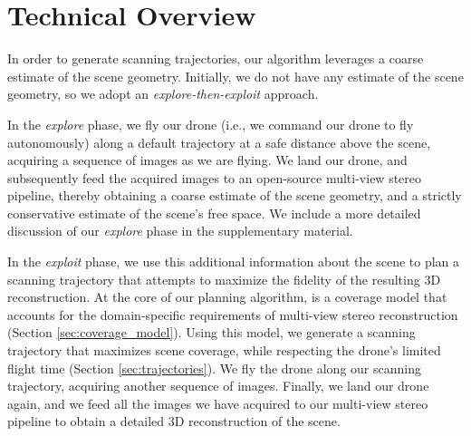 \vspace{-5pt}
\section{Technical Overview}
\label{sec:overview}

In order to generate scanning trajectories, our algorithm leverages a coarse estimate of the scene geometry.
Initially, we do not have any estimate of the scene geometry, so we adopt an \emph{explore-then-exploit} approach.

In the \emph{explore} phase, we fly our drone (i.e., we command our drone to fly autonomously) along a default trajectory at a safe distance above the scene, acquiring a sequence of images as we are flying.
We land our drone, and subsequently feed the acquired images to an open-source multi-view stereo pipeline, thereby obtaining a coarse estimate of the scene geometry, and  a strictly conservative estimate of the scene's free space.
We include a more detailed discussion of our \emph{explore} phase in the supplementary material.

In the \emph{exploit} phase, we use this additional information about the scene to plan a scanning trajectory that attempts to maximize the fidelity of the resulting 3D reconstruction.
At the core of our planning algorithm, is a coverage model that accounts for the domain-specific requirements of multi-view stereo reconstruction (Section \ref{sec:coverage_model}).
Using this model, we generate a scanning trajectory that maximizes scene coverage, while respecting the drone's limited flight time (Section \ref{sec:trajectories}). 
We fly the drone along our scanning trajectory, acquiring another sequence of images.
Finally, we land our drone again, and we feed all the images we have acquired to our multi-view stereo pipeline to obtain a detailed 3D reconstruction of the scene.

